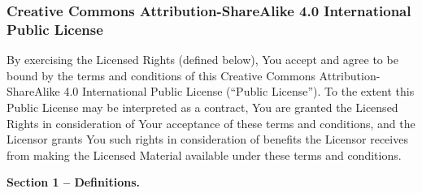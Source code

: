 	\subsubsection{Creative Commons Attribution-ShareAlike 4.0 International Public License}
	\par By exercising the Licensed Rights (defined below), You accept and agree to be bound by the terms and conditions of this 
	Creative Commons Attribution-ShareAlike 4.0 International Public License (``Public License''). To the extent this Public 
	License may be interpreted as a contract, You are granted the Licensed Rights in consideration of Your acceptance of these 
	terms and conditions, and the Licensor grants You such rights in consideration of benefits the Licensor receives from making 
	the Licensed Material available under these terms and conditions.
	\par \textbf{Section 1 – Definitions.}
